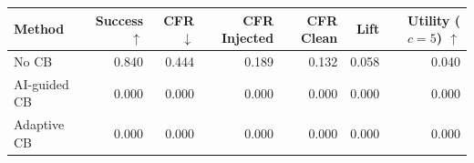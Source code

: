 \begin{tabular}{lrrrrrr}
\toprule
Method & Success $\uparrow$ & CFR $\downarrow$ & CFR Injected & CFR Clean & Lift & Utility ($c=5$) $\uparrow$ \\
\midrule
No CB & 0.840 & 0.444 & 0.189 & 0.132 & 0.058 & 0.040 \\
AI-guided CB & 0.000 & 0.000 & 0.000 & 0.000 & 0.000 & 0.000 \\
Adaptive CB & 0.000 & 0.000 & 0.000 & 0.000 & 0.000 & 0.000 \\
\bottomrule
\end{tabular}
